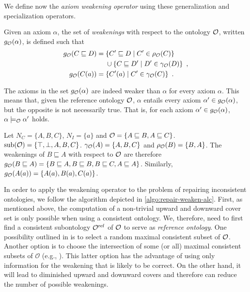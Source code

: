 We define now the \emph{axiom weakening operator} using these generalization and specialization operators.

\begin{definition}
  Given an axiom $\alpha$, the set of \emph{weakenings} with respect to the ontology $\mathcal{O}$, written $g_\mathcal{O}(\alpha)$, is defined such that
  \begin{align*}
    g_\mathcal{O}(C \sqsubseteq D) ={} & \{ C' \sqsubseteq D \mid C' \in \rho_\mathcal{O} (C) \} \\
    & \cup \{ C \sqsubseteq D' \mid D' \in \gamma_\mathcal{O}(D) \} \enspace, \\
    g_\mathcal{O}(C(a)) ={} & \{ C'(a) \mid C' \in \gamma_\mathcal{O}(C) \} \enspace.
  \end{align*}
\end{definition}

The axioms in the set $g_\mathcal{O}(\alpha)$ are indeed weaker than $\alpha$ for every axiom $\alpha$. This means that, given the reference ontology $\mathcal{O}$, $\alpha$ entails every axiom $\alpha' \in g_\mathcal{O}(\alpha)$, but the opposite is not necessarily true. That is, for each axiom $\alpha' \in g_\mathcal{O}(\alpha)$, $\alpha \models_\mathcal{O} \alpha'$ holds.

\begin{example}
  Let $N_C = \{ A, B, C \}$, $N_I = \{ a \}$ and $\mathcal{O} = \{ A \sqsubseteq B, A \sqsubseteq C \}$. ${\operatorname{sub}}(\mathcal{O}) = \{\top, \bot, A, B, C\}$. $\gamma_\mathcal{O}(A) = \{ A, B, C \}$ and $\rho_\mathcal{O}(B) = \{ B, A \}$. The weakenings of $B \sqsubseteq A$ with respect to $\mathcal{O}$ are therefore $g_\mathcal{O}(B \sqsubseteq A) = \{ B \sqsubseteq A, B \sqsubseteq B, B \sqsubseteq C, A \sqsubseteq A \}$. Similarly, $g_\mathcal{O}(A(a)) = \{ A(a), B(a), C(a) \}$.
\end{example}

In order to apply the weakening operator to the problem of repairing inconsistent ontologies, we follow the algorithm depicted in \cref{algo:repair-weaken-alc}. First, as mentioned above, the computation of a non-trivial upward and downward cover set is only possible when using a consistent ontology. We, therefore, need to first find a consistent subontology ${\mathcal{O}^\textnormal{ref}}$ of $\mathcal{O}$ to serve as \emph{reference ontology}. One possibility outlined in \cite{troquard2018repairing} is to select a random maximal consistent subset of $\mathcal{O}$. Another option is to choose the intersection of some (or all) maximal consistent subsets of $\mathcal{O}$ (e.g., \cite{LLRRS10}). This latter option has the advantage of using only information for the weakening that is likely to be correct. On the other hand, it will lead to diminished upward and downward covers and therefore can reduce the number of possible weakenings.

